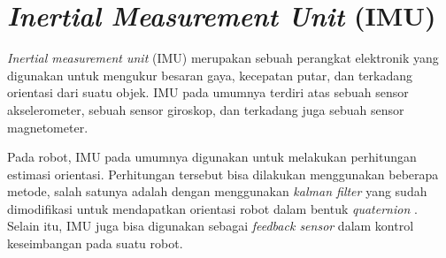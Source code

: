 \section{\emph{Inertial Measurement Unit} (IMU)}
\label{sec:imu}

\emph{Inertial measurement unit} (IMU) merupakan sebuah perangkat elektronik yang digunakan untuk mengukur besaran gaya, kecepatan putar, dan terkadang orientasi dari suatu objek.
IMU pada umumnya terdiri atas sebuah sensor akselerometer,
  sebuah sensor giroskop, dan terkadang juga sebuah sensor magnetometer.

Pada robot, IMU pada umumnya digunakan untuk melakukan perhitungan estimasi orientasi.
Perhitungan tersebut bisa dilakukan menggunakan beberapa metode,
  salah satunya adalah dengan menggunakan \emph{kalman filter} yang sudah dimodifikasi untuk mendapatkan orientasi robot dalam bentuk \emph{quaternion} \citep{cit:kim2004}.
Selain itu, IMU juga bisa digunakan sebagai \emph{feedback sensor} dalam kontrol keseimbangan pada suatu robot.
